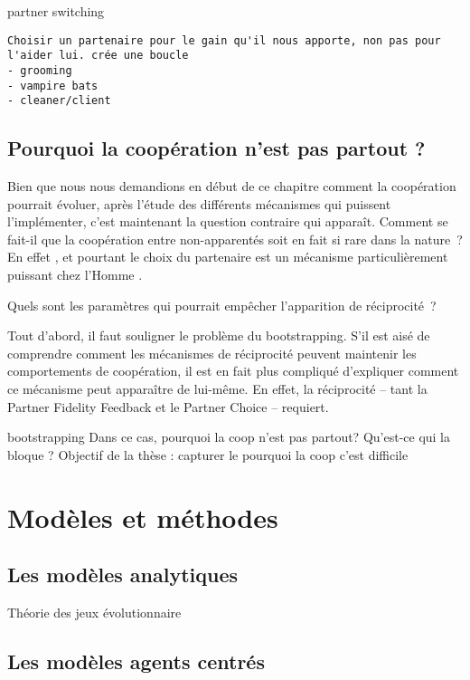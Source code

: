 partner switching

\cite{Aktipis2011}


\begin{verbatim}
Choisir un partenaire pour le gain qu'il nous apporte, non pas pour l'aider lui. crée une boucle
- grooming
- vampire bats
- cleaner/client
\end{verbatim}

\subsection{Pourquoi la coopération n'est pas partout ?}

Bien que nous nous demandions en début de ce chapitre comment la coopération pourrait évoluer, après l'étude des différents mécanismes qui puissent l'implémenter, c'est maintenant la question contraire qui apparaît. Comment se fait-il que la coopération entre non-apparentés soit en fait si rare dans la nature ? En effet , et pourtant le choix du partenaire est un mécanisme particulièrement puissant chez l'Homme . 

Quels sont les paramètres qui pourrait empêcher l'apparition de réciprocité ?

Tout d'abord, il faut souligner le problème du bootstrapping. S'il est aisé de comprendre comment les mécanismes de réciprocité peuvent maintenir les comportements de coopération, il est en fait plus compliqué d'expliquer comment ce mécanisme peut apparaître de lui-même. En effet, la réciprocité -- tant la Partner Fidelity Feedback et le Partner Choice -- requiert.

bootstrapping
Dans ce cas, pourquoi la coop n'est pas partout? Qu'est-ce qui la bloque ?
Objectif de la thèse : capturer le pourquoi la coop c'est difficile



\section{Modèles et méthodes}

\subsection{Les modèles analytiques}

Théorie des jeux évolutionnaire

\subsection{Les modèles agents centrés}

